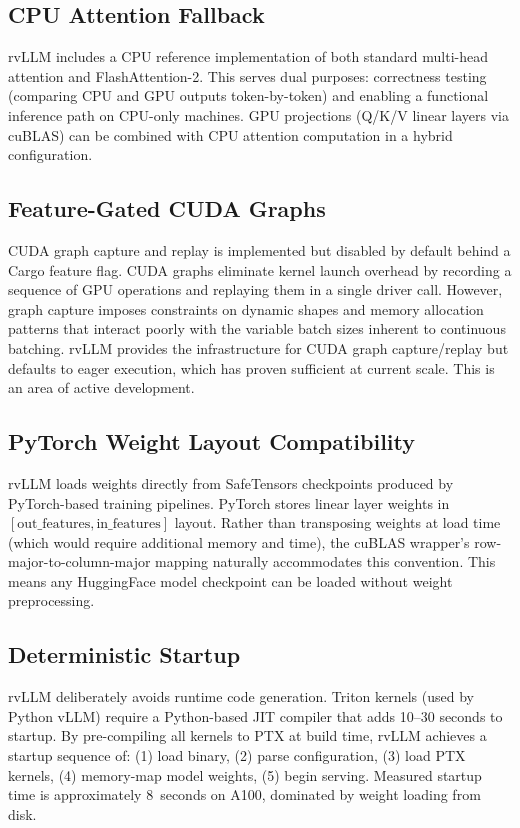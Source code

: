 \documentclass[11pt,a4paper]{article}
\begin{document}
\subsection{CPU Attention Fallback}

rvLLM includes a CPU reference implementation of both standard multi-head attention and
FlashAttention-2. This serves dual purposes: correctness testing (comparing CPU and GPU
outputs token-by-token) and enabling a functional inference path on CPU-only machines.
GPU projections (Q/K/V linear layers via cuBLAS) can be combined with CPU attention
computation in a hybrid configuration.

\subsection{Feature-Gated CUDA Graphs}

CUDA graph capture and replay is implemented but disabled by default behind a Cargo
feature flag. CUDA graphs eliminate kernel launch overhead by recording a sequence of
GPU operations and replaying them in a single driver call. However, graph capture
imposes constraints on dynamic shapes and memory allocation patterns that interact
poorly with the variable batch sizes inherent to continuous batching. rvLLM provides
the infrastructure for CUDA graph capture/replay but defaults to eager execution,
which has proven sufficient at current scale. This is an area of active development.

\subsection{PyTorch Weight Layout Compatibility}

rvLLM loads weights directly from SafeTensors checkpoints produced by PyTorch-based
training pipelines. PyTorch stores linear layer weights in $[\text{out\_features},
\text{in\_features}]$ layout. Rather than transposing weights at load time (which
would require additional memory and time), the cuBLAS wrapper's row-major-to-column-major
mapping naturally accommodates this convention. This means any HuggingFace model
checkpoint can be loaded without weight preprocessing.

\subsection{Deterministic Startup}

rvLLM deliberately avoids runtime code generation. Triton kernels (used by Python
vLLM) require a Python-based JIT compiler that adds 10--30 seconds to startup. By
pre-compiling all kernels to PTX at build time, rvLLM achieves a startup sequence of:
(1) load binary, (2) parse configuration, (3) load PTX kernels, (4) memory-map model
weights, (5) begin serving. Measured startup time is approximately 8~seconds on A100,
dominated by weight loading from disk.
\end{document}
